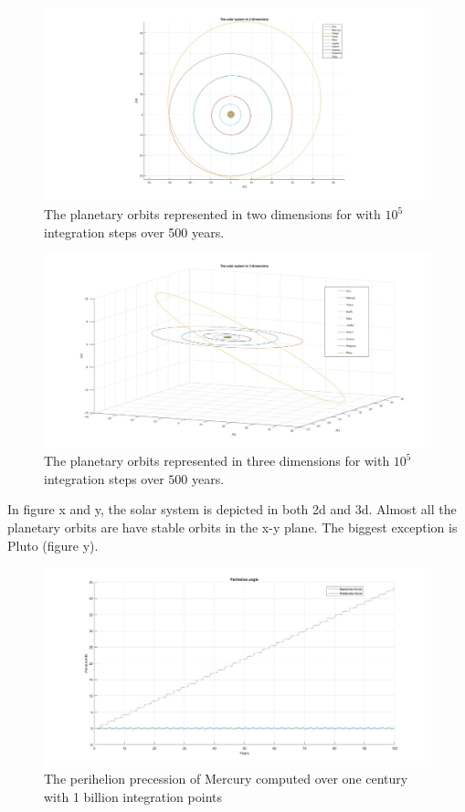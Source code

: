 \documentclass[10pt,a4paper]{article}
\begin{document}
\begin{figure} [H]  
\centerline{\includegraphics[scale=0.40]{2dsolsys.jpg}}
\caption{The planetary orbits represented in two dimensions for with $10^5$ integration steps over 500 years.}
\end{figure}



\begin{figure} [H]

\centerline{\includegraphics[scale=0.35]{3dsolsys.jpg}}
\caption{The planetary orbits represented in three dimensions for with $10^5$ integration steps over $500$ years.}

\end{figure}


In figure x and y, the solar system is depicted in both 2d and 3d. Almost all the planetary orbits are have stable orbits in the x-y plane. The biggest exception is Pluto (figure y). 





\begin{figure} [H]
\centerline{\includegraphics[scale=0.3]{perihelion.jpg}}
\caption{The perihelion precession of Mercury computed over one century with 1 billion integration points}
\end{figure} 
\end{document}
